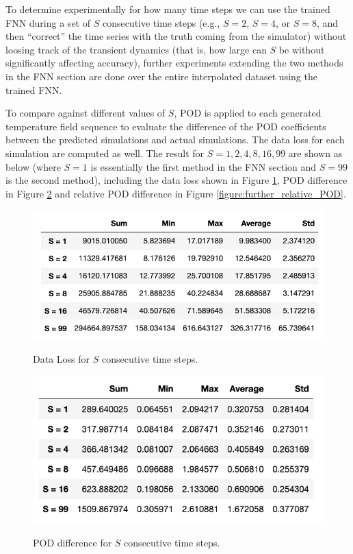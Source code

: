 To determine experimentally for how many time steps we can use the trained FNN during a set of $S$ consecutive time steps (e.g., $S=2$, $S=4$, or $S=8$, and then ``correct'' the time series with the truth coming from the simulator) without loosing track of the transient dynamics (that is, how large can $S$ be without significantly affecting accuracy), further experiments extending the two methods in the FNN section are done over the entire interpolated dataset using the trained FNN.

To compare against different values of $S$, POD is applied to each generated temperature field sequence to evaluate the difference of the POD coefficients between the predicted simulations and actual simulations. The data loss for each simulation are computed as well. The result for $S = 1, 2, 4, 8, 16, 99$ are shown as below (where $S=1$ is essentially the first method in the FNN section and $S=99$ is the second method), including the data loss shown in Figure \ref{figure:further_loss}, POD difference in Figure \ref{figure:further_POD} and relative POD difference in Figure \ref{figure:further_relative_POD}.

\begin{figure}[H]
    \caption{Data Loss for $S$ consecutive time steps.}
    \includegraphics[scale=0.7]{figures/mantle_convection_images/further_testings/Data_Loss_table.png}
    \label{figure:further_loss}
\end{figure}

\begin{figure}[H]
    \caption{POD difference for $S$ consecutive time steps.}
    \includegraphics[scale=0.7]{figures/mantle_convection_images/further_testings/POD_table.png}
    \label{figure:further_POD}
\end{figure}

